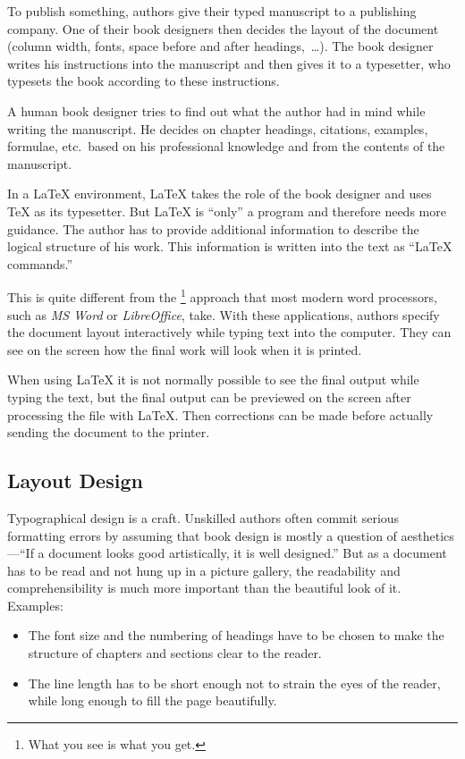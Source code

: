 To publish something, authors give their typed manuscript to a
publishing company. One of their book designers then
decides the layout of the document (column width, fonts, space before
and after headings,~\ldots). The book designer writes his instructions
into the manuscript and then gives it to a typesetter, who typesets the
book according to these instructions.

A human book designer tries to find out what the author had in mind
while writing the manuscript. He decides on chapter headings,
citations, examples, formulae, etc.\ based on his professional
knowledge and from the contents of the manuscript.

In a \LaTeX{} environment, \LaTeX{} takes the role of the book designer and
uses \TeX{} as its typesetter. But \LaTeX{} is \enquote{only} a program and
therefore needs more guidance. The author has to provide additional information
to describe the logical structure of his work. This information is written into
the text as \enquote{\LaTeX{} commands.}

This is quite different from the \footnote{What you see is
  what you get.} approach that most modern word processors, such as
\emph{MS Word} or \emph{LibreOffice}, take. With these
applications, authors specify the document layout interactively while
typing text into the computer. They can see on the
screen how the final work will look when it is printed.

When using \LaTeX{} it is not normally possible to see the final output
while typing the text, but the final output can be previewed on the
screen after processing the file with \LaTeX. Then corrections can be
made before actually sending the document to the printer.

\subsection{Layout Design}\label{sec:layout_design}

Typographical design is a craft. Unskilled authors often commit
serious formatting errors by assuming that book design is mostly a
question of aesthetics---\enquote{If a document looks good artistically,
  it is well designed.} But as a document has to be read and not hung
up in a picture gallery, the readability and comprehensibility is
much more important than the beautiful look of it.
Examples:
\begin{itemize}
  \item The font size and the numbering of headings have to be chosen to make
        the structure of chapters and sections clear to the reader.
  \item The line length has to be short enough not to strain
        the eyes of the reader, while long enough to fill the page
        beautifully.
\end{itemize}


